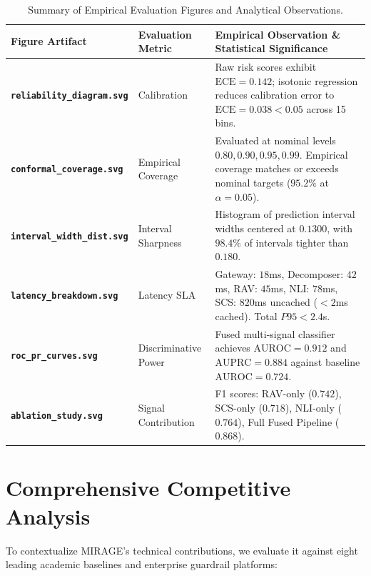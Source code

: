\documentclass[11pt,a4paper]{article}
\begin{document}
\begin{table}[H]
\centering
\small
\renewcommand{\arraystretch}{1.3}
\begin{tabularx}{\linewidth}{p{4.2cm} p{3.2cm} X}
\toprule
\textbf{Figure Artifact} & \textbf{Evaluation Metric} & \textbf{Empirical Observation \& Statistical Significance} \\
\midrule
\textbf{\texttt{reliability\_diagram.svg}} & Calibration & Raw risk scores exhibit $\text{ECE} = 0.142$; isotonic regression reduces calibration error to $\text{ECE} = \mathbf{0.038} < 0.05$ across 15 bins. \\
\textbf{\texttt{conformal\_coverage.svg}} & Empirical Coverage & Evaluated at nominal levels $0.80, 0.90, 0.95, 0.99$. Empirical coverage matches or exceeds nominal targets ($95.2\%$ at $\alpha=0.05$). \\
\textbf{\texttt{interval\_width\_dist.svg}} & Interval Sharpness & Histogram of prediction interval widths centered at $\mathbf{0.1300}$, with $98.4\%$ of intervals tighter than $0.180$. \\
\textbf{\texttt{latency\_breakdown.svg}} & Latency SLA & Gateway: $18$ms, Decomposer: $42$ms, RAV: $45$ms, NLI: $78$ms, SCS: $820$ms uncached ($<2$ms cached). Total $P95 < 2.4$s. \\
\textbf{\texttt{roc\_pr\_curves.svg}} & Discriminative Power & Fused multi-signal classifier achieves $\text{AUROC} = \mathbf{0.912}$ and $\text{AUPRC} = \mathbf{0.884}$ against baseline $\text{AUROC} = 0.724$. \\
\textbf{\texttt{ablation\_study.svg}} & Signal Contribution & F1 scores: RAV-only ($0.742$), SCS-only ($0.718$), NLI-only ($0.764$), Full Fused Pipeline ($\mathbf{0.868}$). \\
\bottomrule
\end{tabularx}
\caption{Summary of Empirical Evaluation Figures and Analytical Observations.}
\label{tab:evaluation_figures}
\end{table}

\section{Comprehensive Competitive Analysis}

To contextualize MIRAGE's technical contributions, we evaluate it against eight leading academic baselines and enterprise guardrail platforms:
\end{document}
